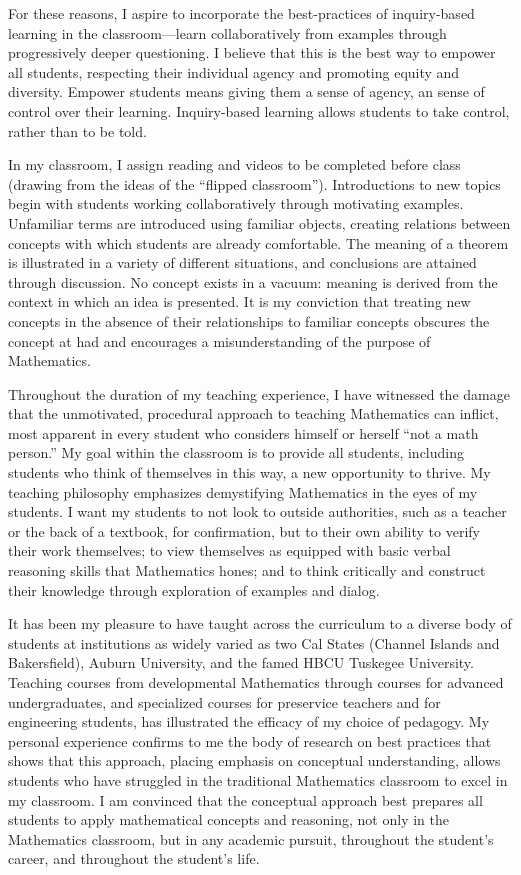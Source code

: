 \documentclass[11pt]{article}
\begin{document}
For these reasons, I aspire to incorporate the best-practices of
inquiry-based learning in the classroom---learn collaboratively from
examples through progressively deeper questioning. I believe that this
is the best way to empower all students, respecting their individual
agency and promoting equity and diversity. Empower students means giving
them a sense of agency, an sense of control over their learning.
Inquiry-based learning allows students to take control, rather than to
be told.

In my classroom, I assign reading and videos to be completed before
class (drawing from the ideas of the ``flipped classroom'').
Introductions to new topics begin with students working collaboratively
through motivating examples. Unfamiliar terms are introduced using
familiar objects, creating relations between concepts with which
students are already comfortable. The meaning of a theorem is
illustrated in a variety of different situations, and conclusions are
attained through discussion. No concept exists in a vacuum: meaning is
derived from the context in which an idea is presented. It is my
conviction that treating new concepts in the absence of their
relationships to familiar concepts obscures the concept at had and
encourages a misunderstanding of the purpose of Mathematics.

Throughout the duration of my teaching experience, I have witnessed the
damage that the unmotivated, procedural approach to teaching Mathematics
can inflict, most apparent in every student who considers himself or
herself ``not a math person.'' My goal within the classroom is to
provide all students, including students who think of themselves in this
way, a new opportunity to thrive. My teaching philosophy emphasizes
demystifying Mathematics in the eyes of my students. I want my students
to not look to outside authorities, such as a teacher or the back of a
textbook, for confirmation, but to their own ability to verify their
work themselves; to view themselves as equipped with basic verbal
reasoning skills that Mathematics hones; and to think critically and
construct their knowledge through exploration of examples and dialog.

It has been my pleasure to have taught across the curriculum to a
diverse body of students at institutions as widely varied as two Cal
States (Channel Islands and Bakersfield), Auburn University, and the
famed HBCU Tuskegee University. Teaching courses from developmental
Mathematics through courses for advanced undergraduates, and specialized
courses for preservice teachers and for engineering students, has
illustrated the efficacy of my choice of pedagogy. My personal
experience confirms to me the body of research on best practices that
shows that this approach, placing emphasis on conceptual understanding,
allows students who have struggled in the traditional Mathematics
classroom to excel in my classroom. I am convinced that the conceptual
approach best prepares all students to apply mathematical concepts and
reasoning, not only in the Mathematics classroom, but in any academic
pursuit, throughout the student's career, and throughout the student's
life.
\end{document}
